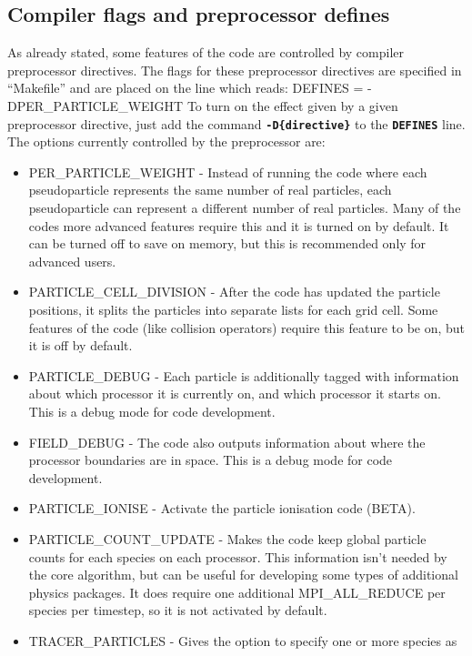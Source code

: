 \documentclass[12pt,a4paper]{article}
\newcommand{\inlinecode}[1]{{\color{warwickred} \bf\texttt{#1}}}
\newenvironment{boxverbatim}{\lboxverbatim{none}}{\endlboxverbatim}
\begin{document}
\subsection{Compiler flags and preprocessor defines}
As already stated, some features of the code are controlled by compiler
preprocessor directives. The flags for these preprocessor directives are
specified in ``Makefile'' and are placed on the line which reads:
\begin{boxverbatim}
DEFINES = -DPER_PARTICLE_WEIGHT
\end{boxverbatim}
To turn on the effect given by a given preprocessor directive, just add the
command \inlinecode{-D\{directive\}} to the \inlinecode{DEFINES} line. The
options currently controlled by the preprocessor are:\\
\begin{itemize}
\item PER\_PARTICLE\_WEIGHT - Instead of running the code where each
  pseudoparticle represents the same number of real particles, each
  pseudoparticle can represent a different number of real particles. Many of
  the codes more advanced features require this and it is turned on by
  default. It can be turned off to save on memory, but this is recommended
  only for advanced users.
\item PARTICLE\_CELL\_DIVISION - After the code has updated the particle
  positions, it splits the particles into separate lists for each grid
  cell. Some features of the code (like collision operators) require this
  feature to be on, but it is off by default.
\item PARTICLE\_DEBUG - Each particle is additionally tagged with information
  about which processor it is currently on, and which processor it starts
  on. This is a debug mode for code development.
\item FIELD\_DEBUG - The code also outputs information about where the
  processor boundaries are in space. This is a debug mode for code development.
\item PARTICLE\_IONISE - Activate the particle ionisation code (BETA).
\item PARTICLE\_COUNT\_UPDATE - Makes the code keep global particle counts for
  each species on each processor. This information isn't needed by the core
  algorithm, but can be useful for developing some types of additional physics
  packages. It does require one additional MPI\_ALL\_REDUCE per species per
  timestep, so it is not activated by default.
\item TRACER\_PARTICLES - Gives the option to specify one or more species as

\end{itemize}
\end{document}

